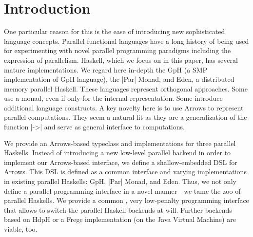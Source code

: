 
\section{Introduction}
\label{sec:introduction}
%
%
%

One particular reason for this is the ease of introducing new sophisticated language
concepts. Parallel functional languages have a long history of being used for experimenting with novel parallel programming paradigms including the expression of parallelism. Haskell, which we focus on in this paper, has  several mature implementations. We regard here in-depth
the GpH (a SMP implementation of GpH language), the
|Par| Monad, and Eden, a distributed memory parallel Haskell. These
languages represent orthogonal approaches. Some use a monad, even if
only for the internal representation. Some introduce additional
language constructs. 
A key novelty here is to use Arrows to represent parallel computations. They seem a natural fit as they are a generalization of the function |->| and serve as general interface to computations.

We provide an Arrows-based typeclass and implementations for three parallel Haskells.
Instead of 
introducing a new low-level parallel backend in order to implement our
Arrows-based interface, we define a shallow-embedded DSL for Arrows. This DSL
is defined as a common interface and varying implementations in
existing parallel Haskells: GpH, |Par| Monad, and
Eden. Thus, we not only define a parallel programming interface in a
novel manner - we tame the zoo of parallel Haskells. We provide a
common , very low-penalty programming interface that allows to switch
the parallel Haskell backends at will. Further backends based on HdpH or a Frege implementation (on the Java Virtual Machine) are viable, too.

